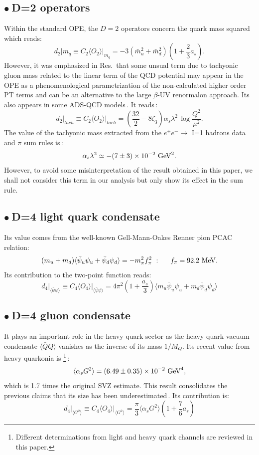 \documentclass[review]{elsarticle}
\def\beq{\begin{equation}}
\def\eeq{\end{equation}}
\def\ga{\left(}
\def\dr{\right)}
\def\la{\langle}
\def\ra{\rangle}
\def\b{$\bullet~$}
\begin{document}
\subsection*{\b D=2  operators}
Within the standard OPE, the $D=2$ operators concern the quark mass squared which reads:
\beq
d_2\vert{m_q}\equiv C_2\la O_2\ra\vert_{m_q} = -3(\bar m_u^2+\bar m_d^2)\ga 1+\frac{2}{3}a_s\dr.
\eeq
However, it was emphasized in Res.\,\cite{CNZa,SZ,CNZb,D2rev} that some unsual term due to tachyonic gluon mass related to the linear term of the QCD potential may appear in the OPE as a phenomenological parametrization of the non-calculated higher order PT terms and can be an alternative to the large $\beta$-UV renormalon approach. Its  also appears in some ADS-QCD models\,\cite{ADS1,ADS3}. It reads\,\cite{CNZa}:
\beq
d_2\vert_{tach}\equiv C_2\la O_2\ra\vert_{tach} = \ga \frac{32}{2}-8\zeta_3\dr \alpha_s\lambda^2\,\log\frac{Q^2}{\mu^2}. 
\eeq
The value of the tachyonic mass extracted from the $e^+e^-\to$ I=1 hadrons data  and $\pi$ sum rules is\,\cite{SN93,SN95,SNTAU,TERAYEV}:
\beq
\alpha_s\lambda^2\simeq -(7\pm 3)\times 10^{-2}~{\rm GeV}^2.
\eeq
However, to avoid some misinterpretation of the result obtained in this paper, we shall not consider this term in our analysis
but only show its effect in the sum rule. 
\subsection*{\b D=4  light quark condensate}
Its value comes from the well-known Gell-Mann-Oakes Renner pion PCAC relation:
\beq
 (m_u+m_d)\la\bar \psi_u\psi_u+\bar \psi_d\psi_d\ra =-m_\pi^2f_\pi^2\,\, :\,\,\,\,\,\,\,\,\, f_\pi=92.2~{\rm MeV}.
\eeq
Its contribution to the two-point function reads:
\beq
d_4\vert_{\la\bar\psi\psi\ra}\equiv C_4\la O_4\ra\vert_{\la\bar\psi\psi\ra}=4\pi^2\ga 1+\frac{a_s}{3}\dr\la m_u\bar \psi_u\psi_u+m_d\bar \psi_d\psi_d\ra
\eeq
\subsection*{\b  D=4 gluon condensate}
 It plays an important role in the heavy quark sector as the heavy quark vacuum condensate $\la\bar QQ\ra$ vanishes 
 as the inverse of its mass $1/M_Q$. Its  recent value from heavy quarkonia is\,\cite{SNparam}\,\footnote{Different determinations from light and heavy quark channels are reviewed in this paper.}\,:
\beq
\la\alpha_s G^2\ra= (6.49\pm 0.35)\times 10^{-2}~{\rm GeV}^4,
\label{eq:asg2}
\eeq
which is 1.7 times the original SVZ estimate. This result consolidates the previous claims that its size has been underestimated\,\cite{BELLa,BERTa,FESR,LNT}. 
Its contribution  is:
\beq
d_4\vert_{\la G^2\ra}\equiv C_4\la O_4\ra\vert_{\la G^2\ra}=\frac{\pi}{3}\la\alpha_s G^2\ra \ga 1+\frac{7}{6}a_s\dr 
\eeq
\end{document}
